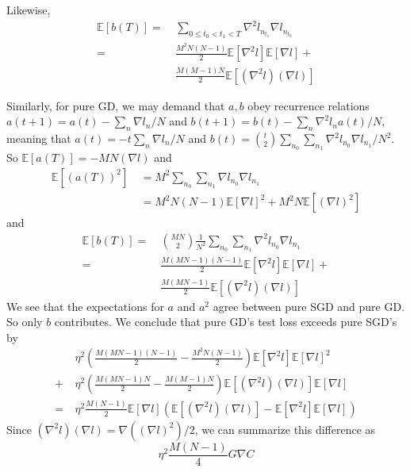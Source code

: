 \documentclass{article}
\newcommand{\expct}[1]{\mathbb{E}\left[#1\right]}
\newcommand{\wrap}[1]{\left(#1\right)}
\begin{document}
        Likewise, 
        \begin{align*}
            \expct{b(T)}
            = 
            ~&\sum_{0\leq t_0 < t_1 < T} \nabla^2 l_{n_{t_1}} \nabla l_{n_{t_0}} \\
            =
            ~&\frac{M^2N(N-1)}{2} \expct{\nabla^2 l} \expct{\nabla l} + \\
            ~&\frac{M(M-1)N}{2}  \expct{(\nabla^2 l) (\nabla l)} 
        \end{align*}

        Similarly, for pure GD, we may demand that $a, b$ obey recurrence
        relations $a(t+1) = a(t) - \sum_n \nabla l_n/N$ and
        $b(t+1) = b(t) - \sum_n \nabla^2 l_n a(t)/N$, meaning that
        $a(t) = -t \sum_n \nabla l_n/N$ and
        $b(t) = {t \choose 2} \sum_{n_0} \sum_{n_1} \nabla^2 l_{n_0} \nabla l_{n_1}/N^2$.
        So $\expct{a(T)} = -MN(\nabla l)$ and
        \begin{align*}
            \expct{(a(T))^2}
            ~&=
            M^2 
            \sum_{n_0} \sum_{n_1} \nabla l_{n_0} \nabla l_{n_1} \\
            ~&= 
            M^2 N(N-1)  \expct{\nabla l}^2 + 
            M^2 N       \expct{(\nabla l)^2}
        \end{align*}
        and
        \begin{align*}
            \expct{b(T)}
            = 
            ~&{MN \choose 2}\frac{1}{N^2}
            \sum_{n_0} \sum_{n_1} \nabla^2 l_{n_0} \nabla l_{n_1} \\
            =
            ~&\frac{M(MN-1)(N-1)}{2} \expct{\nabla^2 l} \expct{\nabla l} + \\
            ~&\frac{M(MN-1)}{2}      \expct{(\nabla^2 l) (\nabla l)} 
        \end{align*}
        We see that the expectations for $a$ and $a^2$ agree between pure SGD and
        pure GD.  So only $b$ contributes.  We conclude that pure GD's test loss
        exceeds pure SGD's by
        \begin{align*}
               ~&\eta^2
                \wrap{\frac{M(MN-1)(N-1)}{2}  - \frac{M^2N(N-1)}{2}}
                \expct{\nabla^2 l} \expct{\nabla l}^2 \\
            +   ~&\eta^2 
                \wrap{\frac{M(MN-1)N}{2} - \frac{M(M-1)N}{2}}
                \expct{(\nabla^2 l) (\nabla l)} \expct{\nabla l} \\
            = 
                ~&\eta^2     \frac{M(N-1)}{2}
            \expct{\nabla l} \wrap{
                  \expct{(\nabla^2 l) (\nabla l)}
                - \expct{\nabla^2 l} \expct{\nabla l}
            }
        \end{align*}
        Since $(\nabla^2 l) (\nabla l) = \nabla((\nabla l)^2)/2$, we can 
        summarize this difference as
        $$
            \eta^2 \frac{M(N-1)}{4}
            G \nabla C 
        $$
\end{document}
